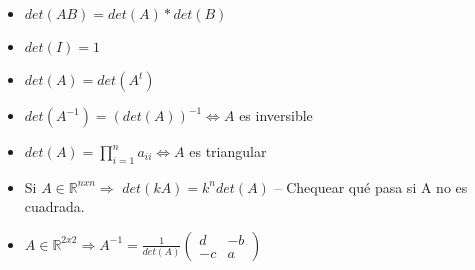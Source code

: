 \begin{enumerate}
\begin{itemize}
        \item $det(AB) = det(A)*det(B)$
        \item $det(I) = 1$
        \item $det(A) = det(A^t)$
        \item $det(A^{-1}) = (det(A))^{-1} \iff A$ es inversible
        \item $det(A) = \prod_{i=1}^{n}a_{ii} \iff A$ es triangular 
        \item {Si $A \in \mathbb{R}^{nxn} \Rightarrow$} $det(kA) = k^ndet(A)$ -- Chequear qué pasa si A no es cuadrada.
        \item $A \in \mathbb{R}^{2x2} \Rightarrow A^{-1} = \frac{1}{det(A)} \begin{pmatrix}
                        d & -b\\
                        -c & a
                        \end{pmatrix}$
    \end{itemize}
\end{enumerate}

